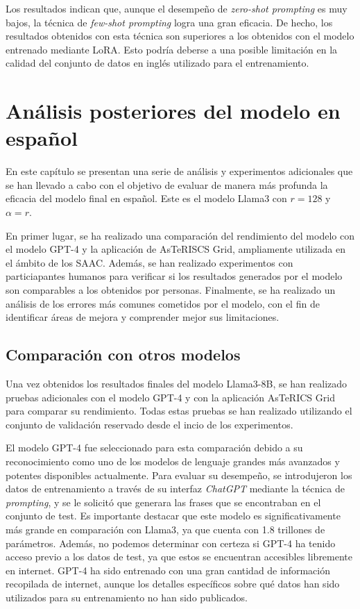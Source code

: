 \documentclass[11pt,spanish,listoffigures,listoftables]{tfgetsinf}
\begin{document}
Los resultados indican que, aunque el desempeño de \textit{zero-shot prompting} es muy bajos, la técnica de \textit{few-shot prompting} logra una gran eficacia. De hecho, los resultados obtenidos con esta técnica son superiores a los obtenidos con el modelo entrenado mediante LoRA. Esto podría deberse a una posible limitación en la calidad del conjunto de datos en inglés utilizado para el entrenamiento.

\chapter{Análisis posteriores del modelo en español} \label{cap5}

En este capítulo se presentan una serie de análisis y experimentos adicionales que se han llevado a cabo con el objetivo de evaluar de manera más profunda la eficacia del modelo final en español. Este es el modelo Llama3 con $r = 128$ y $\alpha = r$.

En primer lugar, se ha realizado una comparación del rendimiento del modelo con el modelo GPT-4 y la aplicación de AsTeRISCS Grid, ampliamente utilizada en el ámbito de los SAAC. Además, se han realizado experimentos con particiapantes humanos para verificar si los resultados generados por el modelo son comparables a los obtenidos por personas. Finalmente, se ha realizado un análisis de los errores más comunes cometidos por el modelo, con el fin de identificar áreas de mejora y comprender mejor sus limitaciones.

\section{Comparación con otros modelos} 

Una vez obtenidos los resultados finales del modelo Llama3-8B, se han realizado pruebas adicionales con el modelo GPT-4 y con la aplicación AsTeRICS Grid para comparar su rendimiento. Todas estas pruebas se han realizado utilizando el conjunto de validación reservado desde el incio de los experimentos.

El modelo GPT-4 fue seleccionado para esta comparación debido a su reconocimiento como uno de los modelos de lenguaje grandes más avanzados y potentes disponibles actualmente. Para evaluar su desempeño, se introdujeron los datos de entrenamiento a través de su interfaz \textit{ChatGPT} mediante la técnica de \textit{prompting}, y se le solicitó que generara las frases que se encontraban en el conjunto de test. Es importante destacar que este modelo es significativamente más grande en comparación con Llama3, ya que cuenta con 1.8 trillones de parámetros. Además, no podemos determinar con certeza si GPT-4 ha tenido acceso previo a los datos de test, ya que estos se encuentran accesibles libremente en internet. GPT-4 ha sido entrenado con una gran cantidad de información recopilada de internet, aunque los detalles específicos sobre qué datos han sido utilizados para su entrenamiento no han sido publicados.
\end{document}

